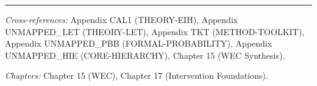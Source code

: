 \vspace{1em}
\hrule
\vspace{0.5em}

\noindent\textit{Cross-references:}
Appendix CAL1 (THEORY-EIH),
Appendix UNMAPPED_LET (THEORY-LET),
Appendix TKT (METHOD-TOOLKIT),
Appendix UNMAPPED_PBB (FORMAL-PROBABILITY),
Appendix UNMAPPED_HIE (CORE-HIERARCHY),
Chapter 15 (WEC Synthesis).

\noindent\textit{Chapters:} Chapter 15 (WEC), Chapter 17 (Intervention Foundations).


